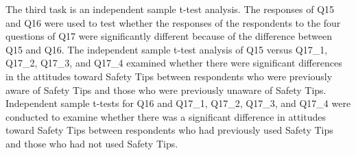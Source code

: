 The third task is an independent sample t-test analysis. The responses of Q15 and Q16 were used to test whether the responses of the respondents to the four questions of Q17 were significantly different because of the difference between Q15 and Q16. The independent sample t-test analysis of Q15 versus Q17\_1, Q17\_2, Q17\_3, and Q17\_4 examined whether there were significant differences in the attitudes toward Safety Tips between respondents who were previously aware of Safety Tips and those who were previously unaware of Safety Tips. Independent sample t-tests for Q16 and Q17\_1, Q17\_2, Q17\_3, and Q17\_4 were conducted to examine whether there was a significant difference in attitudes toward Safety Tips between respondents who had previously used Safety Tips and those who had not used Safety Tips.

